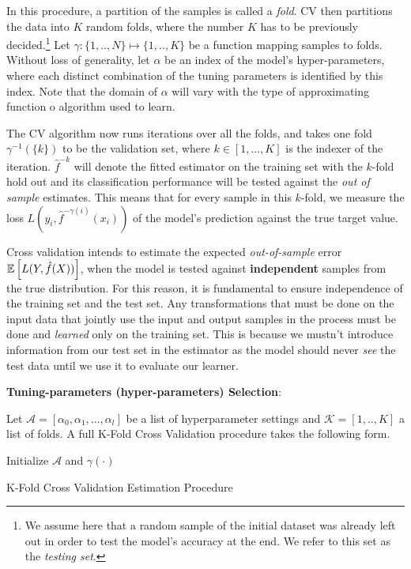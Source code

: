 In this procedure, a partition of the samples is called a \textit{fold}. CV then partitions the data into $K$ random folds, where the number $K$ has to be previously decided.\footnote{ We assume here that a random sample of the initial dataset was already left out in order to test the model's accuracy at the end. We refer to this set as the \textit{testing set}.} Let $\gamma : \{1,..,N\} \mapsto \{1, .., K\}$ be a function mapping samples to folds. Without loss of generality, let $\alpha$ be an index of the model's hyper-parameters, where each distinct combination of the tuning parameters is identified by this index. Note that the domain of $\alpha$ will vary with the type of approximating function o algorithm used to learn.

 The CV algorithm now runs iterations over all the folds, and takes one fold $\gamma^{-1}(\{k\})$ to be the validation set, where $k \in [1,...,K]$ is the indexer of the iteration. $\hat{f}^{-k}$ will denote the fitted estimator on the training set with the $k$-fold hold out and its classification performance will be tested against the \textit{out of sample} estimates. This means that for every sample in this $k$-fold, we measure the loss $L(y_i, \hat{f}^{-\gamma(i)}(x_i))$ of the model's prediction against the true target value.

Cross validation intends to estimate the expected \textit{out-of-sample} error $\operatorname{\mathbb{E}} \left[ L(Y, \hat{f}(X)) \right]$, when the model is tested against \textbf{independent} samples from the true distribution. For this reason, it is fundamental to ensure independence of the training set and the test set. Any transformations that must be done on the input data that jointly use the input and output samples in the process must be done and \textit{learned} only on the training set. This is because we mustn't introduce information from our test set in the estimator as the model should never \textit{see} the test data until we use it to evaluate our learner.

\textbf{Tuning-parameters (hyper-parameters) Selection}:

 Let $\mathcal{A} = [\alpha_0, \alpha_1,..., \alpha_l  ]$ be a list of hyperparameter settings and $\mathcal{K} =[1,..,K]$ a list of folds. A full K-Fold Cross Validation procedure takes the following form.

 \begin{algorithm}%
 \SetAlgoLined
 Initialize $\mathcal{A}$ and $\gamma(\cdot)$\;
 \caption{K-Fold Cross Validation Estimation Procedure}
 \end{algorithm}

